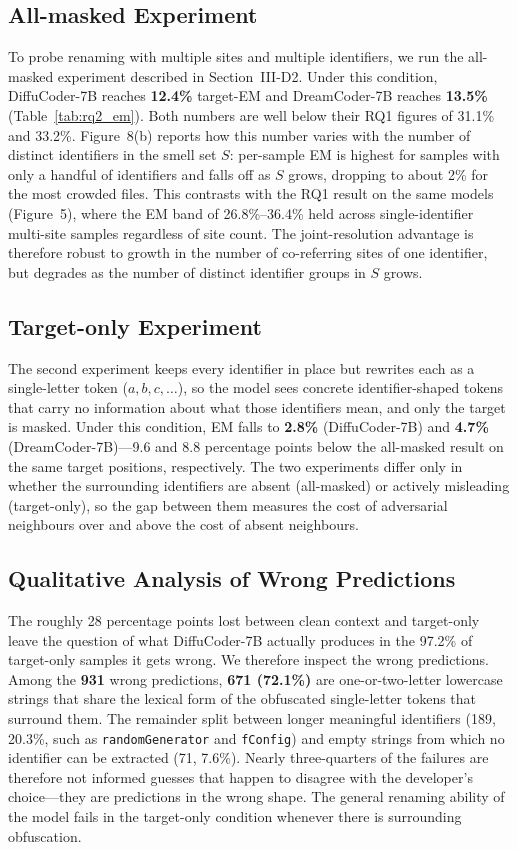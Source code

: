\subsection{All-masked Experiment}
To probe renaming with multiple sites and multiple identifiers, we run the
all-masked experiment described in Section~III-D2. Under this condition,
DiffuCoder-7B reaches \textbf{12.4\%} target-EM and DreamCoder-7B reaches
\textbf{13.5\%} (Table~\ref{tab:rq2_em}). Both numbers are well below their RQ1
figures of 31.1\% and 33.2\%. Figure~8(b) reports how this number varies with
the number of distinct identifiers in the smell set $S$: per-sample EM is
highest for samples with only a handful of identifiers and falls off as $S$
grows, dropping to about 2\% for the most crowded files. This contrasts with
the RQ1 result on the same models (Figure~5), where the EM band of
26.8\%--36.4\% held across single-identifier multi-site samples regardless of
site count. The joint-resolution advantage is therefore robust to growth in the
number of co-referring sites of one identifier, but degrades as the number of
distinct identifier groups in $S$ grows.

\subsection{Target-only Experiment}
The second experiment keeps every identifier in place but rewrites each as a
single-letter token ($a, b, c, \dots$), so the model sees concrete
identifier-shaped tokens that carry no information about what those identifiers
mean, and only the target is masked. Under this condition, EM falls to
\textbf{2.8\%} (DiffuCoder-7B) and \textbf{4.7\%} (DreamCoder-7B)---9.6 and
8.8 percentage points below the all-masked result on the same target positions,
respectively. The two experiments differ only in whether the surrounding
identifiers are absent (all-masked) or actively misleading (target-only), so the
gap between them measures the cost of adversarial neighbours over and above the
cost of absent neighbours.

\subsection{Qualitative Analysis of Wrong Predictions}
The roughly 28 percentage points lost between clean context and target-only
leave the question of what DiffuCoder-7B actually produces in the 97.2\% of
target-only samples it gets wrong. We therefore inspect the wrong predictions.
Among the \textbf{931} wrong predictions, \textbf{671 (72.1\%)} are
one-or-two-letter lowercase strings that share the lexical form of the
obfuscated single-letter tokens that surround them. The remainder split between
longer meaningful identifiers (189, 20.3\%, such as \texttt{randomGenerator} and
\texttt{fConfig}) and empty strings from which no identifier can be extracted
(71, 7.6\%). Nearly three-quarters of the failures are therefore not informed
guesses that happen to disagree with the developer's choice---they are
predictions in the wrong shape. The general renaming ability of the model fails
in the target-only condition whenever there is surrounding obfuscation.

